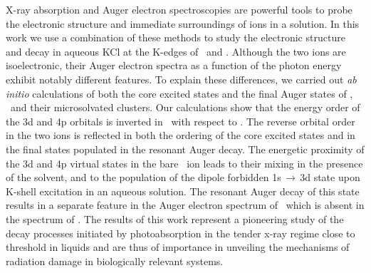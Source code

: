 X-ray absorption and Auger electron spectroscopies are powerful tools to probe the electronic structure and immediate surroundings of ions in a solution. In this work we use a combination of these methods to study the electronic structure and decay in aqueous KCl at the K-edges of \ki~and \cli. Although the two ions are isoelectronic, their Auger electron spectra as a function of the photon energy exhibit notably different features. To explain these differences, we carried out {\it ab initio} calculations of both the core excited states and the final Auger states of \ki, \cli~and their microsolvated clusters. Our calculations show that the energy order of the 3d and 4p orbitals is inverted in \ki~with respect to \cli. The reverse orbital order in the two ions is reflected in both the ordering of the core excited states and in the final states populated in the resonant Auger decay. The energetic proximity of the 3d and 4p virtual states in the bare \ki~ion leads to their mixing in the presence of the solvent, and to the population of the dipole forbidden 1s$\,\rightarrow\,$3d state upon K-shell excitation in an aqueous solution. The resonant Auger decay of this state results in a separate feature in the Auger electron spectrum of \ki~which is absent in the spectrum of \cli.
{\color{red}The results of this work represent a pioneering study of the decay processes initiated by photoabsorption in the tender x-ray regime close to threshold in liquids and are thus of importance in unveiling the mechanisms of radiation damage in biologically relevant systems.}
